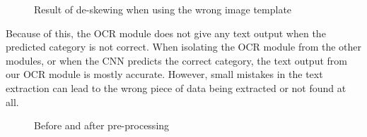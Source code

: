 \begin{figure}[h]
    \caption{Result of de-skewing when using the wrong image template}
    \label{fig:scuffedmatchresult}
\end{figure}

Because of this, the OCR module does not give any text output when the predicted category is not correct.
When isolating the OCR module from the other modules, or when the CNN predicts the correct category, the text output from our OCR module is mostly accurate.
However, small mistakes in the text extraction can lead to the wrong piece of data being extracted or not found at all.

\begin{figure}[h]
    \caption{Before and after pre-processing}
    \label{fig:beforeaftepreprocess}
\end{figure}

